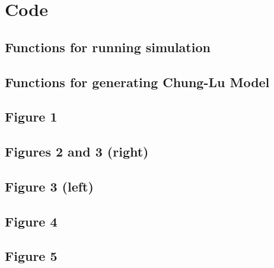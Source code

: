 \documentclass[12pt]{article}
\begin{document}
\section*{Code}

\subsection{Functions for running simulation}


\subsection{Functions for generating Chung-Lu Model}


\subsection{Figure 1}


\subsection{Figures 2 and 3 (right)}


\subsection{Figure 3 (left)}


\subsection{Figure 4}


\subsection{Figure 5}

\end{document}
